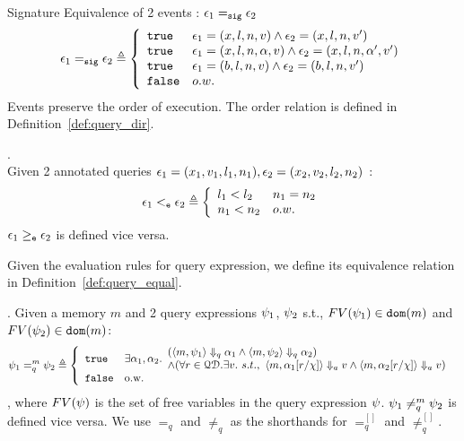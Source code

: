 Signature Equivalence of 2 events : $\mathtt{\epsilon}_1 =_{\mathtt{sig}} \mathtt{\epsilon}_2$
\[
\event_1 \sigeq \event_2 \triangleq
\left\{
\begin{array}{ll}
\etrue & \event_1 = (x, l, n, v) \land \event_2 = (x, l, n, v') \\
\etrue & \event_1 = (x, l, n, \qval, v) \land \event_2 = (x, l, n, \qval', v') \\
\etrue & \event_1 = (b, l, n, v) \land \event_2 = (b, l, n, v') \\
\efalse & o.w.
\end{array}
\right.
\]
%
Events preserve the order of execution. The order relation is defined in Definition~\ref{def:query_dir}.
%
\begin{defn}.
\label{def:query_dir}
\\
Given 2 annotated queries 
$\mathtt{\epsilon}_1 = (x_1, v_1, l_1, n_1), 
\mathtt{\epsilon}_2 = (x_2, v_2, l_2, n_2)$
:
%
\[
\event_1 \eventlt \event_2
 \triangleq 
 \left\{
 \begin{array}{ll}
    l_1 < l_2 & n_1 = n_2
    \\
    n_1 < n_2  & o.w.
\end{array}  
\right.
\]
%
$\mathtt{\epsilon}_1 \geq_{\mathtt{e}} \mathtt{\epsilon}_2$  is defined vice versa.
\end{defn}
%
%
%
Given the evaluation rules for query expression, we define its equivalence relation in Definition~\ref{def:query_equal}.
%
\begin{defn}.
%
\label{def:query_equal}
 Given a memory $m$ and 2 query expressions $\psi_1$, $\psi_2$ s.t., $FV(\psi_1) \in \mathtt{dom}(m)$ and $FV(\psi_2) \in \mathtt{dom}(m)$:
$$
\qexpr_1 =_{q}^{m} \qexpr_2 \triangleq
\left\{
    \begin{array}{ll} 
      \etrue      
      & 
    \exists \qval_1, \qval_2.
    \begin{array}{l} 
      (\config{m,  \qexpr_1} \qarrow \qval_1 \land \config{m,  \qexpr_2 } \qarrow \qval_2) 
      \\
      \land (\forall r \in \qdom. \exists v. ~ s.t., ~ 
            \config{m, \qval_1[r/\chi]} \aarrow v \land \config{m,  \qval_2[r/\chi] } \aarrow v)  
    \end{array}\\
      \efalse         
      & \text{o.w.} 
    \end{array}
    \right.
$$
%
, where $FV(\psi)$ is the set of free variables in the query expression $\psi$.
$\psi_1 \neq_{q}^{m} \psi_2$  is defined vice versa.
%
We use $=_{q}$  and $\neq_{q}$ as the shorthands for $=_{q}^{[]}$ and $\neq^{[]}_{q}$.
\end{defn}
